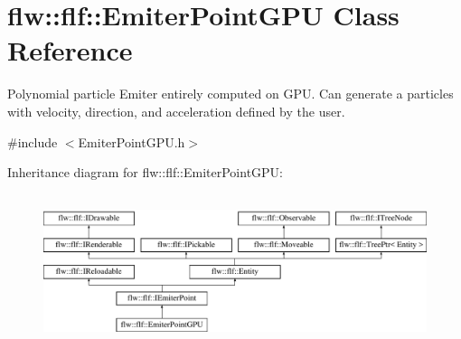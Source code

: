 \hypertarget{classflw_1_1flf_1_1EmiterPointGPU}{}\section{flw\+:\+:flf\+:\+:Emiter\+Point\+G\+PU Class Reference}
\label{classflw_1_1flf_1_1EmiterPointGPU}


Polynomial particle Emiter entirely computed on G\+PU. Can generate a particles with velocity, direction, and acceleration defined by the user.  




{\ttfamily \#include $<$Emiter\+Point\+G\+P\+U.\+h$>$}

Inheritance diagram for flw\+:\+:flf\+:\+:Emiter\+Point\+G\+PU\+:\begin{figure}[H]
\begin{center}
\leavevmode
\includegraphics[height=4.487180cm]{classflw_1_1flf_1_1EmiterPointGPU}
\end{center}
\end{figure}
